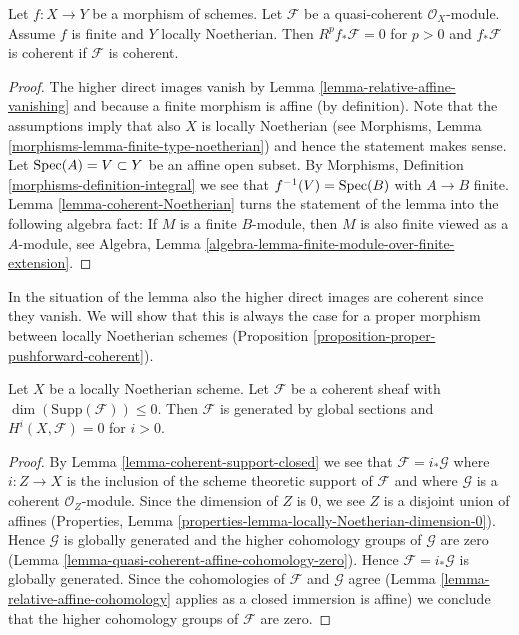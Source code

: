 \begin{lemma}
\label{lemma-finite-pushforward-coherent}
Let $f : X \to Y$ be a morphism of schemes.
Let $\mathcal{F}$ be a quasi-coherent $\mathcal{O}_X$-module.
Assume $f$ is finite and $Y$ locally Noetherian.
Then $R^pf_*\mathcal{F} = 0$ for $p > 0$ and
$f_*\mathcal{F}$ is coherent if $\mathcal{F}$ is coherent.
\end{lemma}

\begin{proof}
The higher direct images vanish by
Lemma \ref{lemma-relative-affine-vanishing} and because
a finite morphism is affine (by definition).
Note that the assumptions imply that also $X$ is locally Noetherian
(see Morphisms, Lemma \ref{morphisms-lemma-finite-type-noetherian})
and hence the statement makes sense.
Let $\mathop{\mathrm{Spec}}(A) = V \subset Y$ be an affine open subset.
By Morphisms, Definition \ref{morphisms-definition-integral}
we see that $f^{-1}(V) = \mathop{\mathrm{Spec}}(B)$ with $A \to B$ finite.
Lemma \ref{lemma-coherent-Noetherian}
turns the statement of the lemma into the following algebra
fact: If $M$ is a finite $B$-module, then $M$ is also finite
viewed as a $A$-module, see
Algebra, Lemma \ref{algebra-lemma-finite-module-over-finite-extension}.
\end{proof}

\noindent
In the situation of the lemma also the higher direct images are
coherent since they vanish.
We will show that this is always the case for a proper morphism
between locally Noetherian schemes
(Proposition \ref{proposition-proper-pushforward-coherent}).

\begin{lemma}
\label{lemma-coherent-support-dimension-0}
Let $X$ be a locally Noetherian scheme. Let $\mathcal{F}$
be a coherent sheaf with $\dim(\text{Supp}(\mathcal{F})) \leq 0$.
Then $\mathcal{F}$ is generated by global sections and
$H^i(X, \mathcal{F}) = 0$ for $i > 0$.
\end{lemma}

\begin{proof}
By Lemma \ref{lemma-coherent-support-closed} we see that
$\mathcal{F} = i_*\mathcal{G}$ where $i : Z \to X$ is the inclusion
of the scheme theoretic support of $\mathcal{F}$ and where $\mathcal{G}$
is a coherent $\mathcal{O}_Z$-module. Since the dimension of $Z$ is
$0$, we see $Z$ is a disjoint union of affines (Properties, Lemma
\ref{properties-lemma-locally-Noetherian-dimension-0}).
Hence $\mathcal{G}$ is globally generated and the higher
cohomology groups of $\mathcal{G}$ are zero
(Lemma \ref{lemma-quasi-coherent-affine-cohomology-zero}).
Hence $\mathcal{F} = i_*\mathcal{G}$ is globally generated.
Since the cohomologies of $\mathcal{F}$ and $\mathcal{G}$ agree
(Lemma \ref{lemma-relative-affine-cohomology} applies as a
closed immersion is affine)
we conclude that the higher cohomology groups of $\mathcal{F}$ are zero.
\end{proof}

